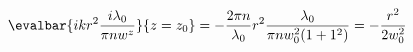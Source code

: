 %
%

\renewcommand{\basename}{piazzaLambda0}
\renewcommand{\dirname}{notes/phy485/}



\beginArtNoToc

\label{chap:\basename}

\begin{equation*}
\evalbar{i k r^2 \frac{i\lambda_0}{\pi n w^z}}{z = z_0}
=
-\frac{2 \pi n}{\lambda_0} r^2
\frac{\lambda_0}{\pi n w_0^2(1 + 1^2)}
=
-\frac{r^2}{2 w_0^2}
\end{equation*}

\EndArticle
